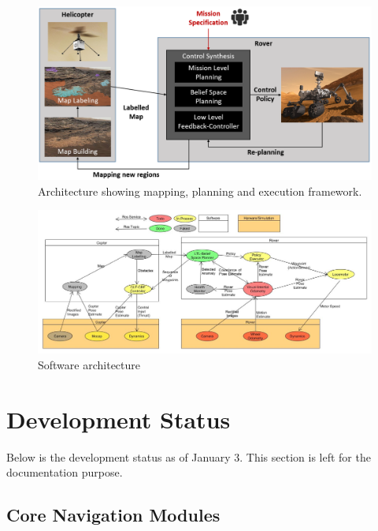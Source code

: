 \documentclass[conference]{IEEEtran}
\begin{document}
\begin{figure}[th!]
	\centering
	\includegraphics[width=\columnwidth]{figs/FunctionalArcV4.png}
	\caption{Architecture showing mapping, planning and execution framework.}
	\label{fig:FuncArc}
\end{figure}    	

\begin{figure}
    \centering
    \includegraphics[width=\textwidth]{BeliefSpaceTemporalLogic/figs/SoftwareArch.jpg}
    \caption{Software architecture}
    \label{fig:software_arch}
\end{figure}



\clearpage
\clearpage
\section{Development Status}

Below is the development status as of January 3. This section is left for the documentation purpose.

\subsection{Core Navigation Modules}
\end{document}
